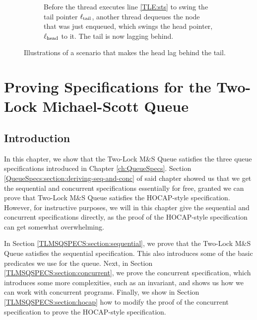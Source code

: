 \documentclass[a4paper, 10pt]{report}
\theoremstyle{definition}
\newcommand{\msq}{M\&S Queue}
\newcommand{\tlmsq}{Two-Lock \msq{}}
\newcommand{\locN}[1]{\loc_{\mathrm{#1}}}
\newcommand{\lochead}{\locN{head}}
\newcommand{\loctail}{\locN{tail}}
\newcommand{\node}{x}
\begin{document}
\begin{figure}
\begin{subfigure}{\textwidth}
\begin{adjustbox}{center}
    \end{adjustbox}
    \caption{Before the thread executes line \ref{TLE:sts} to swing the tail pointer $\loctail$, another thread dequeues the node that was just enqueued, which swings the head pointer, $\lochead$ to it. The tail is now lagging behind.}
    \label{TLMSQ:impl:figure:lag:c}
  \end{subfigure}
  \caption{Illustrations of a scenario that makes the head lag behind the tail.}
  \label{TLMSQ:impl:figure:lag}
\end{figure}


\chapter{Proving Specifications for the Two-Lock Michael-Scott Queue}
\label{ch:TLMSQSPECS}

\section{Introduction}
\label{TLMSQSPECS:section:introduction}

In this chapter, we show that the \tlmsq{} satisfies the three queue specifications introduced in Chapter \ref{ch:QueueSpecs}. Section \ref{QueueSpecs:section:deriving-seq-and-conc} of said chapter showed us that we get the sequential and concurrent specifications essentially for free, granted we can prove that \tlmsq{} satisfies the HOCAP-style specification. However, for instructive purposes, we will in this chapter give the sequential and concurrent specifications directly, as the proof of the HOCAP-style specification can get somewhat overwhelming.

In Section \ref{TLMSQSPECS:section:sequential}, we prove that the \tlmsq{} satisfies the sequential specification. This also introduces some of the basic predicates we use for the queue. Next, in Section \ref{TLMSQSPECS:section:concurrent}, we prove the concurrent specification, which introduces some more complexities, such as an invariant, and shows us how we can work with concurrent programs. Finally, we show in Section \ref{TLMSQSPECS:section:hocap} how to modify the proof of the concurrent specification to prove the HOCAP-style specification.
\end{document}
